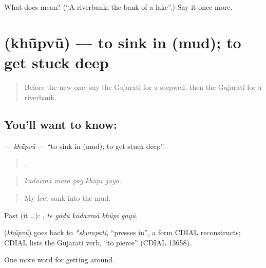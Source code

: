 \begin{tcolorbox}[breakable,colback=teal!4,colframe=teal!35!black,title={Before you move on}]
What does  mean? (\textquotedblleft{}A riverbank; the bank of a lake\textquotedblright{}.) Say it once more.
\end{tcolorbox}
\section[\texorpdfstring{\gu{ખૂંપવું} (khū̃pvũ)}{ખૂંપવું (khū̃pvũ)}]{ (khū̃pvũ) — to sink in (mud); to get stuck deep}

\label{lesson:GU-C441-khupvu}



\begin{quote}
Before the new one: say the Gujarati for a stepwell, then the Gujarati for a riverbank.
\end{quote}

\subsection*{You'll want to know: }
\textbf{} — \emph{khū̃pvũ} — \textquotedblleft{}to sink in (mud); to get stuck deep\textquotedblright{}.

\begin{quote}
    .
\end{quote}

\begin{quote}
\emph{kādavmā̃ mārā pag khū̃pī gayā.}
\end{quote}

\begin{quote}
My feet sank into the mud.
\end{quote}

Past (it …):     , \emph{te gāḍũ kādavmā̃ khū̃pī gayũ}.

\begin{cousinweb}
\textbf{} (\emph{khū̃pvũ}) goes back to \emph{*skumpati}, \textquotedblleft{}presses in\textquotedblright{}, a form CDIAL reconstructs; CDIAL lists the Gujarati verb, \textquotedblleft{}to pierce\textquotedblright{} (CDIAL 13658).
\end{cousinweb}

\begin{grammarlens}[title={What you've built}]
One more word for getting around.
\end{grammarlens}

